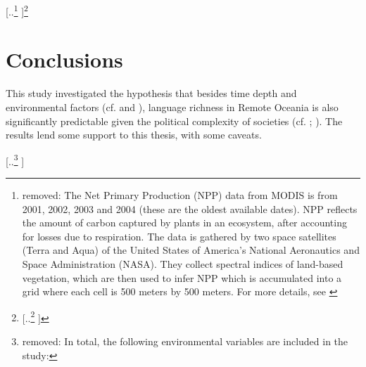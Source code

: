 \documentclass[unnumsec,webpdf,modern,medium]{oup-authoring-template}
\providecommand{\DIFaddtex}[1]{{\protect\color{blue} \sf #1}} %
\providecommand{\DIFdeltex}[1]{{\protect\color{red} [..\footnote{removed: #1} ]}} %
\providecommand{\DIFaddbegin}{} %
\providecommand{\DIFaddend}{} %
\providecommand{\DIFdelbegin}{} %
\providecommand{\DIFdelend}{} %
\providecommand{\DIFadd}[1]{\texorpdfstring{\DIFaddtex{#1}}{#1}} %
\providecommand{\DIFdel}[1]{\texorpdfstring{\DIFdeltex{#1}}{}} %
\newcommand{\DIFscaledelfig}{0.5}
\newlength{\DIFdelgraphicswidth} %
\newlength{\DIFdelgraphicsheight} %
\newcommand{\DIFaddincludegraphics}[2][]{{\color{blue}\fbox{\DIFOincludegraphics[#1]{#2}}}} %
\newcommand{\DIFdelincludegraphics}[2][]{%
\sbox{\DIFdelgraphicsbox}{\DIFOincludegraphics[#1]{#2}}%
\settoboxwidth{\DIFdelgraphicswidth}{\DIFdelgraphicsbox} %
\settoboxtotalheight{\DIFdelgraphicsheight}{\DIFdelgraphicsbox} %
\scalebox{\DIFscaledelfig}{%
\parbox[b]{\DIFdelgraphicswidth}{\usebox{\DIFdelgraphicsbox}\\[-\baselineskip] \rule{\DIFdelgraphicswidth}{0em}}\llap{\resizebox{\DIFdelgraphicswidth}{\DIFdelgraphicsheight}{%
\setlength{\unitlength}{\DIFdelgraphicswidth}%
\begin{picture}(1,1)%
\thicklines\linethickness{2pt} %
{\color[rgb]{1,0,0}\put(0,0){\framebox(1,1){}}}%
{\color[rgb]{1,0,0}\put(0,0){\line( 1,1){1}}}%
{\color[rgb]{1,0,0}\put(0,1){\line(1,-1){1}}}%
\end{picture}%
}\hspace*{3pt}}} %
} %
\DeclareRobustCommand{\DIFaddbegin}{\DIFOaddbegin \let\includegraphics\DIFaddincludegraphics} %
\DeclareRobustCommand{\DIFaddend}{\DIFOaddend \let\includegraphics\DIFOincludegraphics} %
\DeclareRobustCommand{\DIFdelbegin}{\DIFOdelbegin \let\includegraphics\DIFdelincludegraphics} %
\DeclareRobustCommand{\DIFdelend}{\DIFOaddend \let\includegraphics\DIFOincludegraphics} %
\begin{document}
\DIFdel{The Net Primary Production (NPP) data from MODIS is from 2001, 2002, 2003 and 2004 (these are the oldest available dates). NPP reflects the amount of carbon captured by plants in an ecosystem, after accounting for losses due to respiration. The data is gathered by two space satellites (Terra and Aqua) of the United States of America's National Aeronautics and Space Administration (NASA). They collect spectral indices of land-based vegetation, which are then used to infer NPP which is accumulated into a grid where each cell is 500 meters by 500 meters. For more details, see \citet{running2015daily} }\footnote{\DIFdel{The manual is for a previous release, where the grid cells were 1km by 1km. The more recent release is 500m by 500m.}}%
\addtocounter{footnote}{-1}%
\DIFdelend \DIFaddbegin \section{\DIFadd{Conclusions}}
\DIFadd{This study investigated the hypothesis that besides time depth and environmental factors (cf. \citet{curriemace2009, gavin2012island, hua2019ecological} and \citet{Pacheco_Coelho_2019}), language richness in Remote Oceania is also significantly predictable given the political complexity of societies (cf. \citet{turner1884}; \citet{pawley81, pawley2007}). The results lend some support to this thesis, with some caveats}\DIFaddend . 

\DIFdelbegin \DIFdel{In total, the following environmental variables are included in the study:
}%
\end{document}
